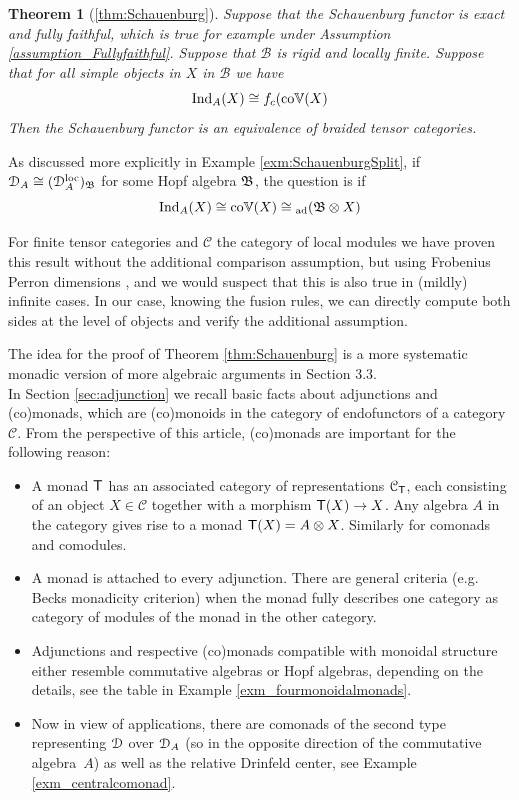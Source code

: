 \documentclass[a4paper, reqno]{amsart}
\theoremstyle{introTheorems}
\newtheorem{introTheorem}{Theorem}
\newcommand\cB{\mathcal{B}}
\newcommand\cC{\mathcal{C}}
\newcommand{\Ind}{\textup{Ind}}
\newcommand\loc{\textup{loc}}
\renewcommand{\1}{\mathbbold{1}}
\begin{document}
\begin{introTheorem}[\ref{thm:Schauenburg}]
Suppose that the Schauenburg functor is exact and fully faithful, which is true for example under Assumption \ref{assumption_Fullyfaithful}. Suppose that $\cB$ is rigid and locally finite. Suppose that 
for all simple objects in $X$ in $\cB$ we have 
$$\Ind_A(X)\cong \forget_c(\coLaugwitz(X)$$
Then the Schauenburg functor is an equivalence of braided tensor categories. \\
\end{introTheorem}

As discussed more explicitly in Example \ref{exm:SchauenburgSplit}, if $\catD_A\cong (\catD_A^\loc)_\NicholsOf$ for some Hopf algebra $\mathfrak{B}$, the question is if 
$$\Ind_A(X)\cong \coLaugwitz(X)\cong {_{\text{ad}}}(\NicholsOf\otimes X)$$

For finite tensor categories and $\cC$ the category of local modules we have proven this result without the additional comparison assumption, but   using Frobenius Perron dimensions \cite[Corollary 3.8.]{CLR23}, and we would suspect that this is also true in (mildly) infinite cases. In our case, knowing the fusion rules, we can directly compute both sides at the level of objects and verify the additional assumption.



\bigskip

The idea for the proof of Theorem \ref{thm:Schauenburg} is a more systematic monadic version of more algebraic arguments in \cite{CLR23} Section 3.3. \\

In Section \ref{sec:adjunction} we recall basic facts about adjunctions and (co)monads, which are (co)monoids in the category of endofunctors of a category $\cC$. From the perspective of this article, (co)monads are important for the following reason:
\begin{itemize}
\item A monad ${\mathsf{T}}$ has an associated category of representations $\cC_\monT$, each consisting of an object $X\in\cC$ together with a morphism ${\mathsf{T}}(X)\to X$. Any algebra $A$ in the category gives rise to a monad ${\mathsf{T}}(X)=A\otimes X$. Similarly for comonads and comodules.
\item A monad is attached to every adjunction. There are general criteria (e.g. Becks monadicity criterion) when the monad fully describes one category as category of modules of the monad in the other category. 
\item Adjunctions and respective (co)monads compatible with monoidal structure either resemble commutative algebras or Hopf algebras, depending on the details, see the table in Example \ref{exm_fourmonoidalmonads}. 
\item Now in view of applications, there are comonads of the second type representing $\mathcal{D}$ over $\mathcal{D}_A$ (so in the opposite direction of the commutative algebra~$A$) as well as the relative Drinfeld center, see Example \ref{exm_centralcomonad}.
\end{itemize}
\end{document}
